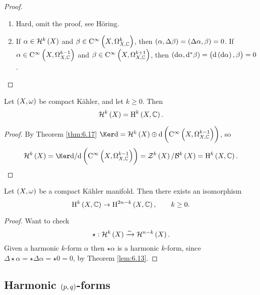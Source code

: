 \begin{proof}
\hfill
\begin{enumerate}
\item Hard, omit the proof, see H\"oring.
\item If $ \alpha \in \HHH^k\br{X} $ and $ \beta \in \C^\infty\br{X, \Omega_{X, \CC}^k} $, then $ \br{\alpha, \Delta\beta} = \br{\Delta\alpha, \beta} = 0 $. If $ \alpha \in \C^\infty\br{X, \Omega_{X, \CC}^{k - 1}} $ and $ \beta \in \C^\infty\br{X, \Omega_{X, \CC}^{k + 1}} $, then $ \br{\d\alpha, \d^*\beta} = \br{\d\br{\d\alpha}, \beta} = 0 $.
\end{enumerate}
\end{proof}

\pagebreak

\begin{theorem}
\label{thm:6.18}
Let $ \br{X, \omega} $ be compact K\"ahler, and let $ k \ge 0 $. Then
$$ \HHH^k\br{X} = \H^k\br{X, \CC}. $$
\end{theorem}

\begin{proof}
By Theorem \ref{thm:6.17} $ \Ker \d = \HHH^k\br{X} \oplus \d\br{\C^\infty\br{X, \Omega_{X, \CC}^{k - 1}}} $, so
$$ \HHH^k\br{X} = \Ker \d / \d\br{\C^\infty\br{X, \Omega_{X, \CC}^{k - 1}}} = \ZZZ^k\br{X} / \BBB^k\br{X} = \H^k\br{X, \CC}. $$
\end{proof}

\begin{theorem}
Let $ \br{X, \omega} $ be a compact K\"ahler manifold. Then there exists an isomorphism
$$ \H^k\br{X, \CC} \to \H^{2n - k}\br{X, \CC}, \qquad k \ge 0. $$
\end{theorem}

\begin{proof}
Want to check
$$ \star : \HHH^k\br{X} \xrightarrow{\sim} \HHH^{n - k}\br{X}. $$
Given a harmonic $ k $-form $ \alpha $ then $ \star\alpha $ is a harmonic $ k $-form, since $ \Delta\star\alpha = \star\Delta\alpha = \star 0 = 0 $, by Theorem \ref{lem:6.13}.
\end{proof}

\subsection{Harmonic \texorpdfstring{$ \br{p, q} $}{(p, q)}-forms}


